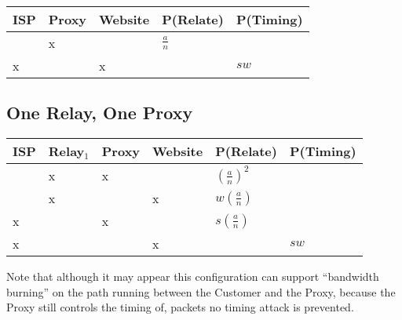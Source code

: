 
\begin{center}
\begin{tabular}{l | l | l | l | l}
  ISP & Proxy & Website & P(Relate)          & P(Timing) \\
  \hline
      & x     &         & $\frac{a}{n}$      & \\
  \hline
  x   &       & x       &                    & $sw$ \\
\end{tabular}
\end{center}


\subsection{One Relay, One Proxy}


\begin{center}
\begin{tabular}{l | l | l | l | l | l}
  ISP & Relay$_1$ & Proxy & Website & P(Relate)          & P(Timing) \\
  \hline
      & x         & x     &         & $(\frac{a}{n})^2$  & \\
  \hline
      & x         &       & x       & $w(\frac{a}{n})$   & \\
  \hline
  x   &           & x     &         & $s(\frac{a}{n})$   & \\
  \hline
  x   &           &       & x       &                    & $sw$ \\
\end{tabular}
\end{center}

Note that although it may appear this configuration can support
``bandwidth burning'' on the path running between the Customer and the
Proxy, because the Proxy still controls the timing of, packets no
timing attack is prevented.

